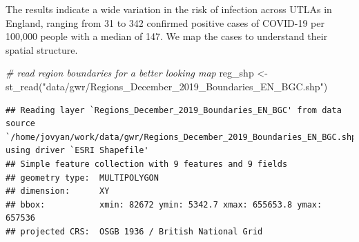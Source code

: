 \documentclass[
]{book}
\newenvironment{Shaded}{\begin{snugshade}}{\end{snugshade}}
\newcommand{\CommentTok}[1]{\textcolor[rgb]{0.56,0.35,0.01}{\textit{#1}}}
\newcommand{\FunctionTok}[1]{\textcolor[rgb]{0.00,0.00,0.00}{#1}}
\newcommand{\NormalTok}[1]{#1}
\newcommand{\OtherTok}[1]{\textcolor[rgb]{0.56,0.35,0.01}{#1}}
\newcommand{\StringTok}[1]{\textcolor[rgb]{0.31,0.60,0.02}{#1}}
\begin{document}
The results indicate a wide variation in the risk of infection across UTLAs in England, ranging from 31 to 342 confirmed positive cases of COVID-19 per 100,000 people with a median of 147. We map the cases to understand their spatial structure.

\begin{Shaded}
\begin{Highlighting}[]
\CommentTok{\# read region boundaries for a better looking map}
\NormalTok{reg\_shp }\OtherTok{\textless{}{-}} \FunctionTok{st\_read}\NormalTok{(}\StringTok{"data/gwr/Regions\_December\_2019\_Boundaries\_EN\_BGC.shp"}\NormalTok{)}
\end{Highlighting}
\end{Shaded}

\begin{verbatim}
## Reading layer `Regions_December_2019_Boundaries_EN_BGC' from data source `/home/jovyan/work/data/gwr/Regions_December_2019_Boundaries_EN_BGC.shp' using driver `ESRI Shapefile'
## Simple feature collection with 9 features and 9 fields
## geometry type:  MULTIPOLYGON
## dimension:      XY
## bbox:           xmin: 82672 ymin: 5342.7 xmax: 655653.8 ymax: 657536
## projected CRS:  OSGB 1936 / British National Grid
\end{verbatim}
\end{document}

